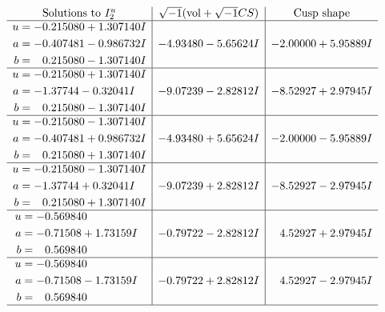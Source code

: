 \documentclass[1p]{elsarticle_modified}
\theoremstyle{definition}
\newcommand{\I}{\sqrt{-1}}
\begin{document}
$$\begin{array}{c|c|c}  
\text{Solutions to }I^u_{2}& \I (\text{vol} + \sqrt{-1}CS) & \text{Cusp shape}\\
 \hline 
\begin{aligned}
u &= -0.215080 + 1.307140 I \\
a &= -0.407481 - 0.986732 I \\
b &= \phantom{-}0.215080 - 1.307140 I\end{aligned}
 & -4.93480 - 5.65624 I & -2.00000 + 5.95889 I \\ \hline\begin{aligned}
u &= -0.215080 + 1.307140 I \\
a &= -1.37744 - 0.32041 I \\
b &= \phantom{-}0.215080 - 1.307140 I\end{aligned}
 & -9.07239 - 2.82812 I & -8.52927 + 2.97945 I \\ \hline\begin{aligned}
u &= -0.215080 - 1.307140 I \\
a &= -0.407481 + 0.986732 I \\
b &= \phantom{-}0.215080 + 1.307140 I\end{aligned}
 & -4.93480 + 5.65624 I & -2.00000 - 5.95889 I \\ \hline\begin{aligned}
u &= -0.215080 - 1.307140 I \\
a &= -1.37744 + 0.32041 I \\
b &= \phantom{-}0.215080 + 1.307140 I\end{aligned}
 & -9.07239 + 2.82812 I & -8.52927 - 2.97945 I \\ \hline\begin{aligned}
u &= -0.569840\phantom{ +0.000000I} \\
a &= -0.71508 + 1.73159 I \\
b &= \phantom{-}0.569840\phantom{ +0.000000I}\end{aligned}
 & -0.79722 - 2.82812 I & \phantom{-}4.52927 + 2.97945 I \\ \hline\begin{aligned}
u &= -0.569840\phantom{ +0.000000I} \\
a &= -0.71508 - 1.73159 I \\
b &= \phantom{-}0.569840\phantom{ +0.000000I}\end{aligned}
 & -0.79722 + 2.82812 I & \phantom{-}4.52927 - 2.97945 I\\
 \hline 
 \end{array}$$\newpage\newpage\renewcommand{\arraystretch}{1}
\end{document}
